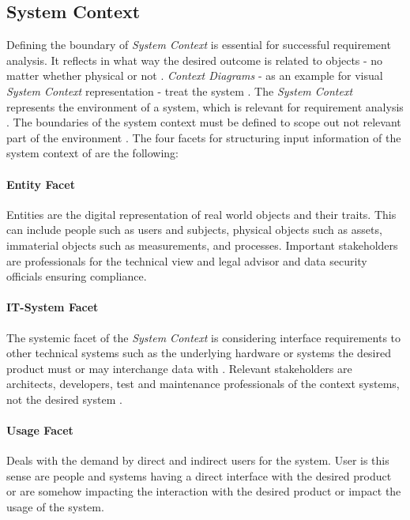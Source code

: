 \subsection{System Context}
Defining the boundary of \textit{System Context} is essential for successful requirement analysis. It reflects in what way the desired outcome is related to objects - no matter whether physical or not \parencite[55]{Pohl.2007}. \textit{Context Diagrams} - as an example for visual \textit{System Context} representation - treat the system  \parencite[76]{Lauesen.2008}. The \textit{System Context} represents the environment of a system, which is relevant for requirement analysis \parencite[55]{Pohl.2007}. The boundaries of the system context must be defined to scope out not relevant part of the environment \parencite[55-56]{Pohl.2007}. The four facets for structuring input information of the system context of \textcite{Pohl.2007} are the following:
\paragraph*{Entity Facet} 
Entities are the digital representation of real world objects and their traits. This can include people such as users and subjects, physical objects such as assets, immaterial objects such as measurements, and processes. Important stakeholders are  professionals for the technical view and legal advisor and data security officials ensuring compliance. \parencite[see.][70-71]{Pohl.2007}
\paragraph*{IT-System Facet}
The systemic facet of the \textit{System Context} is considering interface requirements to other technical systems such as the underlying hardware or systems the desired product must or may interchange data with \parencite[see.][192]{Kotonya.2000}. Relevant stakeholders are architects, developers, test and maintenance professionals of the context systems, not the desired system \parencite[see.][72]{Pohl.2007}.
\paragraph*{Usage Facet} Deals with the demand by direct and indirect users for the system. User is this sense are people and systems having a direct interface with the desired product or are somehow impacting the interaction with the desired product or impact the usage of the system. \parencite[see.][75-77]{Pohl.2007}
